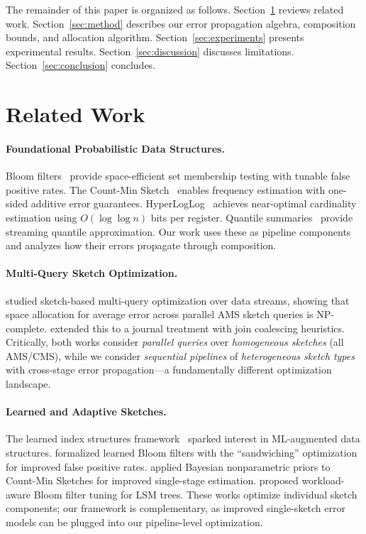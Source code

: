 \documentclass[preprint]{article}
\begin{document}
The remainder of this paper is organized as follows. Section~\ref{sec:related} reviews related work. Section~\ref{sec:method} describes our error propagation algebra, composition bounds, and allocation algorithm. Section~\ref{sec:experiments} presents experimental results. Section~\ref{sec:discussion} discusses limitations. Section~\ref{sec:conclusion} concludes.

\section{Related Work}
\label{sec:related}

\paragraph{Foundational Probabilistic Data Structures.}
Bloom filters~\citep{bloom1970space} provide space-efficient set membership testing with tunable false positive rates. The Count-Min Sketch~\citep{Cormode2005CountMin} enables frequency estimation with one-sided additive error guarantees. HyperLogLog~\citep{flajolet2007hyperloglog} achieves near-optimal cardinality estimation using $O(\log \log n)$ bits per register. Quantile summaries~\citep{greenwald2001space} provide streaming quantile approximation. Our work uses these as pipeline components and analyzes how their errors propagate through composition.

\paragraph{Multi-Query Sketch Optimization.}
\citet{dobra2004sketch} studied sketch-based multi-query optimization over data streams, showing that space allocation for average error across parallel AMS sketch queries is NP-complete. \citet{dobra2009multi} extended this to a journal treatment with join coalescing heuristics. Critically, both works consider \emph{parallel queries} over \emph{homogeneous sketches} (all AMS/CMS), while we consider \emph{sequential pipelines} of \emph{heterogeneous sketch types} with cross-stage error propagation---a fundamentally different optimization landscape.

\paragraph{Learned and Adaptive Sketches.}
The learned index structures framework~\citep{kraska2018case} sparked interest in ML-augmented data structures. \citet{mitzenmacher2018model} formalized learned Bloom filters with the ``sandwiching'' optimization for improved false positive rates. \citet{dolera2023learning} applied Bayesian nonparametric priors to Count-Min Sketches for improved single-stage estimation. \citet{zhu2025mnemosyne} proposed workload-aware Bloom filter tuning for LSM trees. These works optimize individual sketch components; our framework is complementary, as improved single-sketch error models can be plugged into our pipeline-level optimization.
\end{document}
